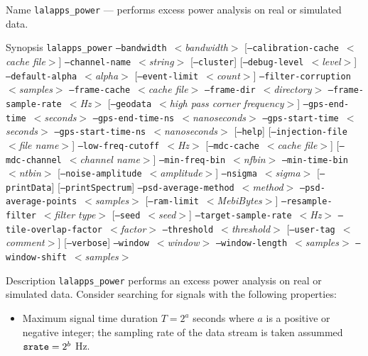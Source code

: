 \begin{entry}

\item[Name]
\texttt{lalapps\_power} --- performs excess power analysis on real or
simulated data.

\newcommand{\prog}[1]{\texttt{#1}}
\newcommand{\option}[1]{\texttt{#1}}
\newcommand{\parm}[1]{$<$\textit{#1}$>$}

\item[Synopsis]
\prog{lalapps\_power}
\option{--bandwidth}~\parm{bandwidth}
[\option{--calibration-cache}~\parm{cache file}]
\option{--channel-name}~\parm{string}
[\option{--cluster}]
[\option{--debug-level}~\parm{level}]
\option{--default-alpha}~\parm{alpha}
[\option{--event-limit}~\parm{count}]
\option{--filter-corruption}~\parm{samples}
\option{--frame-cache}~\parm{cache file}
\option{--frame-dir}~\parm{directory}
\option{--frame-sample-rate}~\parm{Hz}
[\option{--geodata}~\parm{high pass corner frequency}]
\option{--gps-end-time}~\parm{seconds}
\option{--gps-end-time-ns}~\parm{nanoseconds}
\option{--gps-start-time}~\parm{seconds}
\option{--gps-start-time-ns}~\parm{nanoseconds}
[\option{--help}]
[\option{--injection-file}~\parm{file name}]
\option{--low-freq-cutoff}~\parm{Hz}
[\option{--mdc-cache}~\parm{cache file}]
[\option{--mdc-channel}~\parm{channel name}]
\option{--min-freq-bin}~\parm{nfbin}
\option{--min-time-bin}~\parm{ntbin}
[\option{--noise-amplitude}~\parm{amplitude}]
\option{--nsigma}~\parm{sigma}
[\option{--printData}]
[\option{--printSpectrum}]
\option{--psd-average-method}~\parm{method}
\option{--psd-average-points}~\parm{samples}
[\option{--ram-limit}~\parm{MebiBytes}]
\option{--resample-filter}~\parm{filter type}
[\option{--seed}~\parm{seed}]
\option{--target-sample-rate}~\parm{Hz}
\option{--tile-overlap-factor}~\parm{factor}
\option{--threshold}~\parm{threshold}
[\option{--user-tag}~\parm{comment}]
[\option{--verbose}]
\option{--window}~\parm{window}
\option{--window-length}~\parm{samples}
\option{--window-shift}~\parm{samples}

\item[Description] 
\prog{lalapps\_power} performs an excess power analysis on real or
simulated data.  Consider searching for signals with the following
properties:
\begin{itemize}
\item Maximum signal time duration $T=2^a$ seconds where $a$ is a positive
or negative integer;  the sampling rate of the data stream is taken
assummed $\mbox{\texttt{srate}} = 2^b$ Hz.


\end{itemize}
\end{entry}
